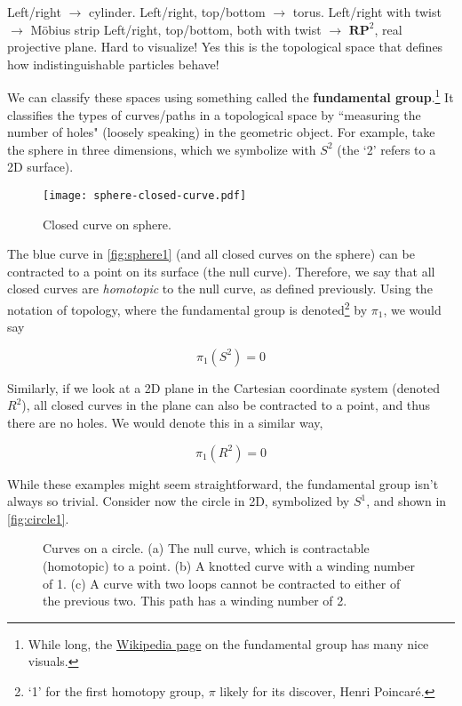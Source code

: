 \documentclass[12pt, english]{book}
\begin{document}
Left/right $\rightarrow$ cylinder.
Left/right, top/bottom $\rightarrow$ torus.
Left/right with twist $\rightarrow$ M{\"o}bius strip
Left/right, top/bottom, both with twist $\rightarrow$ $\mathbf{RP}^2$, real projective plane.
Hard to visualize!
Yes this is the topological space that defines how indistinguishable particles behave!

We can classify these spaces using something called the \textbf{fundamental group}.\footnote{While long, the \href{https://en.wikipedia.org/wiki/Fundamental_group}{Wikipedia page} on the fundamental group has many nice visuals.}
It classifies the types of curves/paths in a topological space by ``measuring the number of holes" (loosely speaking) in the geometric object.
For example, take the sphere in three dimensions, which we symbolize with $S^2$ (the `2' refers to a 2D surface).

\begin{figure}[!ht]
	\centering 
	\texttt{[image: sphere-closed-curve.pdf]}
	\caption{Closed curve on sphere.}
	\label{fig:sphere1}
\end{figure}

The blue curve in \autoref{fig:sphere1} (and all closed curves on the sphere) can be contracted to a point on its surface (the null curve).
Therefore, we say that all closed curves are \emph{homotopic} to the null curve, as defined previously.
Using the notation of topology, where the fundamental group is denoted\footnote{`1' for the first homotopy group, $\pi$ likely for its discover, Henri Poincar{\'e}.} by $\pi_1$, we would say 

\begin{equation*}
	\pi_1(S^2) = 0
\end{equation*}

Similarly, if we look at a 2D plane in the Cartesian coordinate system (denoted $R^2$), all closed curves in the plane can also be contracted to a point, and thus there are no holes.
We would denote this in a similar way, 

\begin{equation*}
	\pi_1(R^2) = 0
\end{equation*}

While these examples might seem straightforward, the fundamental group isn't always so trivial.
Consider now the circle in 2D, symbolized by $S^1$, and shown in \autoref{fig:circle1}.

\begin{figure}[!ht]
	\centering 
	 \hfill
	 \hfill
	\caption{Curves on a circle.
	(a) The null curve, which is contractable (homotopic) to a point.
	(b) A knotted curve with a winding number of 1.
	(c) A curve with two loops cannot be contracted to either of the previous two. 
	This path has a winding number of 2.}
	\label{fig:circle1}
\end{figure}
\end{document}
